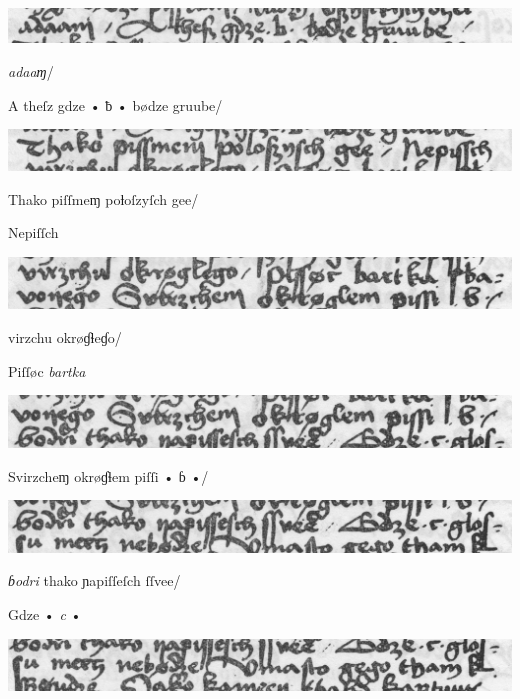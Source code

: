 \newpage
\includegraphics[width=\hsize]{wierszP6}

\splitverse

\textit{adaaɱ}/

\indentVerse A theſz gdze • ƀ • bødze gruube/ 


\includegraphics[width=\hsize]{wierszP7}

\splitverse

Thako piſſmeɱ poƚoſzyſch gee/

\newversesubline Nepiſſch 

\includegraphics[width=\hsize]{wierszP8}

\splitverse virzchu okrøɠɬeɠo/

\newversesubline Piſſøc \textit{bartka} \textit{}

\includegraphics[width=\hsize]{wierszP9}

\fullverselines

 \textit{} Svirzcheɱ okrøɠɬem piſſi • ɓ •/

\includegraphics[width=\hsize]{wierszP10}

\splitverse

\textit{ɓodri} thako ɲapiſſeſch ſſvee/


\indentVerse Gdze • \textit{c} • 

\includegraphics[width=\hsize]{wierszP11}

